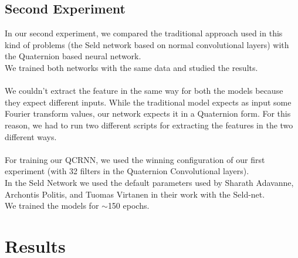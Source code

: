\documentclass{article}
\begin{document}
    \subsection*{Second Experiment}
    In our second experiment, we compared the traditional approach used in this kind of problems (the Seld network based on normal convolutional layers) with the Quaternion based neural network.\\
    We trained both networks with the same data and studied the results.
    \\ \\ We couldn't extract the feature in the same way for both the models because they expect different inputs. While the traditional model expects as input some Fourier transform values, our network expects it in a Quaternion form. For this reason, we had to run two different scripts for extracting the features in the two different ways. 
	\\ \\ For training our QCRNN, we used the winning configuration of our first experiment (with 32 filters in the Quaternion Convolutional layers).
	\\In the Seld Network we used the default parameters used by Sharath Adavanne, Archontis Politis, and Tuomas Virtanen in their work with the Seld-net. 
	\\ We trained the models for $\sim$150 epochs.
    \section{Results}
\end{document}
